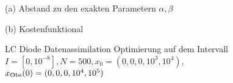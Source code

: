 

% 
% 
% 
% 
\begin{figure}[H]
\footnotesize
\centering
\begin{minipage}[b]{0.49\linewidth}

\caption*{(a) Abstand zu den exakten Parametern $\alpha,\beta$}
\end{minipage}
\begin{minipage}[b]{0.49\linewidth}

\caption*{(b) Kostenfunktional\\$~~$}
\end{minipage}
\caption{LC Diode Datenassimilation Optimierung auf dem Intervall $I = [0,10^{-8}], N=500,x_0=(0,0,0,10^3,10^{4})$,$x_{\text{Obs}}(0) =(0,0,0,10^4,10^{5})$}
\label{fig:lcOpt}
\end{figure}
